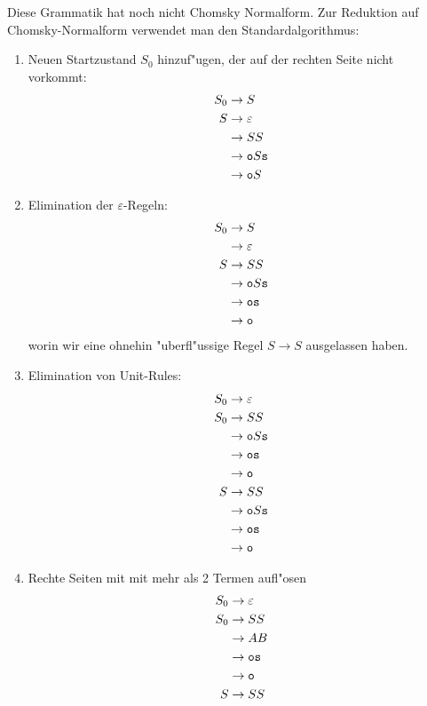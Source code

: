 {\begin{loesung}
Diese Grammatik hat noch nicht Chomsky Normalform. Zur Reduktion auf
Chomsky-Normalform verwendet man den Standardalgorithmus:
\begin{enumerate}
\item Neuen Startzustand $S_0$ hinzuf"ugen, der auf der rechten Seite
nicht vorkommt:
\begin{align*}
S_0&\rightarrow S\\
S&\rightarrow \varepsilon\\
 &\rightarrow SS\\
 &\rightarrow {\tt o}S{\tt s}\\
 &\rightarrow {\tt o}S
\end{align*}
\item Elimination der $\varepsilon$-Regeln:
\begin{align*}
S_0&\rightarrow S\\
   &\rightarrow \varepsilon\\
S&\rightarrow SS\\
 &\rightarrow {\tt o}S{\tt s}\\
 &\rightarrow {\tt o}{\tt s}\\
 &\rightarrow {\tt o}
\end{align*}
worin wir eine ohnehin "uberfl"ussige Regel $S\rightarrow S$
ausgelassen haben.
\item Elimination von Unit-Rules:
\begin{align*}
S_0&\rightarrow \varepsilon\\
S_0&\rightarrow SS\\
   &\rightarrow {\tt o}S{\tt s}\\
   &\rightarrow {\tt o}{\tt s}\\
   &\rightarrow {\tt o}\\
S&\rightarrow SS\\
 &\rightarrow {\tt o}S{\tt s}\\
 &\rightarrow {\tt o}{\tt s}\\
 &\rightarrow {\tt o}
\end{align*}
\item Rechte Seiten mit mit mehr als 2 Termen aufl"osen
\begin{align*}
S_0&\rightarrow \varepsilon\\
S_0&\rightarrow SS\\
   &\rightarrow AB\\
   &\rightarrow {\tt o}{\tt s}\\
   &\rightarrow {\tt o}\\
S&\rightarrow SS\\

\end{align*}
\end{enumerate}
\end{loesung}}
